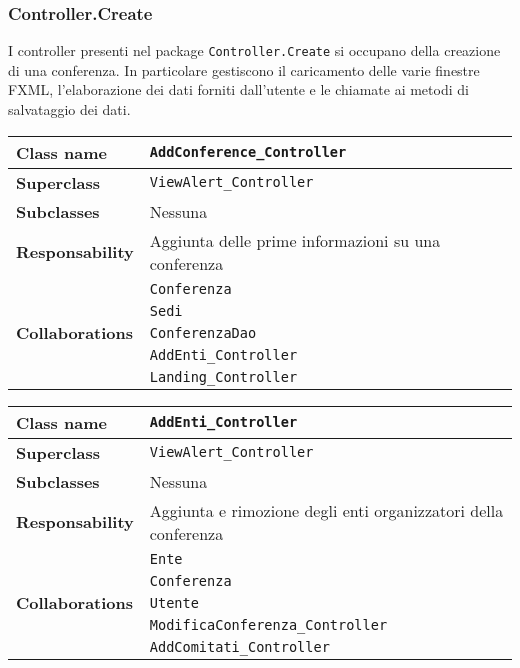 \subsubsection{Controller.Create}
I controller presenti nel package \texttt{Controller.Create} si occupano della creazione di una conferenza. In particolare gestiscono il caricamento delle varie finestre FXML, l'elaborazione dei dati forniti dall'utente e le chiamate ai metodi di salvataggio dei dati.
\begin{table}[h!]
    \begin{tabular}{|l|l|}
        \hline 
        \textbf{Class name} & \texttt{AddConference\_Controller}
        \\ \hline
        \textbf{Superclass} & \texttt{ViewAlert\_Controller}
        \\ \hline
        \multirow{1}{*}{\textbf{Subclasses}} & Nessuna
        \\ \hline
        \textbf{Responsability} & Aggiunta delle prime informazioni su una conferenza
        \\ \hline
        \multirow{5}{*}{\textbf{Collaborations}} & \texttt{Conferenza} \\
		& \texttt{Sedi} \\
		& \texttt{ConferenzaDao} \\
		& \texttt{AddEnti\_Controller} \\
		& \texttt{Landing\_Controller}
        \\ \hline
    \end{tabular}
\end{table}

\begin{table}[h!]
	\begin{tabular}{|l|l|}
		\hline 
		\textbf{Class name} & \texttt{AddEnti\_Controller}
		\\ \hline
		\textbf{Superclass} & \texttt{ViewAlert\_Controller}
		\\ \hline
		\multirow{1}{*}{\textbf{Subclasses}} & Nessuna
		\\ \hline
		\textbf{Responsability} & Aggiunta e rimozione degli enti organizzatori della conferenza
		\\ \hline
		\multirow{5}{*}{\textbf{Collaborations}} & \texttt{Ente} \\
		& \texttt{Conferenza}\\
		& \texttt{Utente}\\
		& \texttt{ModificaConferenza\_Controller}\\
		& \texttt{AddComitati\_Controller}
		\\ \hline
	\end{tabular}
\end{table}

